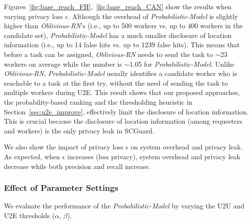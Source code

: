 \documentclass{USC-Thesis}
\newcommand{\SCG}{{SCGuard}}
\numberwithin{equation}{chapter}
\begin{document}
Figures~\ref{fig:base_reach_FH},~\ref{fig:base_reach_CAN} show the results when varying privacy loss $\epsilon$.
Although the overhead of \emph{Probabilistic-Model} is slightly higher than \emph{Oblivious-RN}'s (i.e., up to 500 workers vs. up to 400 workers in the candidate set), \emph{Probabilistic-Model} has a much smaller disclosure of location information (i.e., up to 14 false hits vs. up to 1239 false hits). This means that before a task can be assigned, \emph{Oblivious-RN} needs to send the task to $\sim$23 workers on average while the number is $\sim$1.05 for \emph{Probabilistic-Model}. Unlike \emph{Oblivious-RN}, \emph{Probabilistic-Model} usually identifies a candidate worker who is reachable to a task at the first try, without the need of sending the task to multiple workers during U2E. This result shows that our proposed approaches, the probability-based ranking and the thresholding heuristic in Section~\ref{sec:u2e_improve}, effectively limit the disclosure of location information.
This is crucial because the disclosure of location information (among requesters and workers) is the only privacy leak in \SCG.

We also show the impact of privacy loss $\epsilon$ on system overhead and privacy leak. As expected, when $\epsilon$ increases (less privacy), system overhead and privacy leak decrease while both precision and recall increase.

\subsubsection{Effect of Parameter Settings}
\label{label:thresholds}
We evaluate the performance of  the  \emph{Probabilistic-Model} by varying the U2U and U2E thresholds ($\alpha$, $\beta$).
\end{document}
